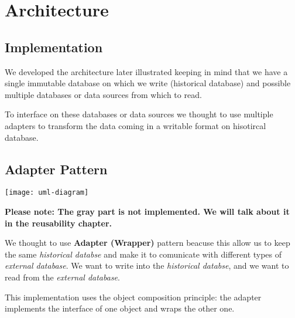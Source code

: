 \section{Architecture}

\subsection{Implementation}

We developed the architecture later illustrated keeping in mind that we have a single immutable database on which we write (historical database) and possible multiple databases or data sources from which to read.

To interface on these databases or data sources we thought to use multiple adapters to transform the data coming in a writable format on hisotircal database.

\subsection{Adapter Pattern}

\begin{center}
\texttt{[image: uml-diagram]}
\end{center}

\textbf{Please note: The gray part is not implemented. We will talk about it in the reusability chapter.}

We thought to use \textbf{Adapter (Wrapper)} pattern beacuse this allow us to keep the same \textit{historical databse} and make it to comunicate with different types of \textit{external database}. We want to write into the \textit{historical databse}, and we want to read from the \textit{external database}.

This implementation uses the object composition principle: the adapter implements the interface of one object and wraps the other one.

